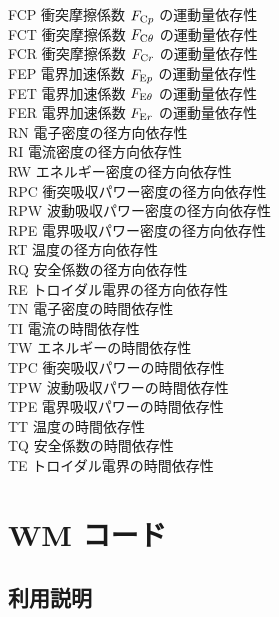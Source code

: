 \documentclass[11pt]{jarticle}
\begin{document}
\begin{tabbing}
\> FCP  \>衝突摩擦係数 $F_{\mathrm{C}p}$ の運動量依存性\\
\> FCT  \>衝突摩擦係数 $F_{\mathrm{C}\theta}$ の運動量依存性\\
\> FCR  \>衝突摩擦係数 $F_{\mathrm{C}r}$ の運動量依存性\\
\> FEP  \>電界加速係数 $F_{\mathrm{E}p}$ の運動量依存性\\
\> FET  \>電界加速係数 $F_{\mathrm{E}\theta}$ の運動量依存性\\
\> FER  \>電界加速係数 $F_{\mathrm{E}r}$ の運動量依存性\\
\> RN   \>電子密度の径方向依存性\\
\> RI   \>電流密度の径方向依存性\\
\> RW   \>エネルギー密度の径方向依存性\\
\> RPC  \>衝突吸収パワー密度の径方向依存性\\
\> RPW  \>波動吸収パワー密度の径方向依存性\\
\> RPE  \>電界吸収パワー密度の径方向依存性\\
\> RT   \>温度の径方向依存性\\
\> RQ   \>安全係数の径方向依存性\\
\> RE   \>トロイダル電界の径方向依存性\\
\> TN   \>電子密度の時間依存性\\
\> TI   \>電流の時間依存性\\
\> TW   \>エネルギーの時間依存性\\
\> TPC  \>衝突吸収パワーの時間依存性\\
\> TPW  \>波動吸収パワーの時間依存性\\
\> TPE  \>電界吸収パワーの時間依存性\\
\> TT   \>温度の時間依存性\\
\> TQ   \>安全係数の時間依存性\\
\> TE   \>トロイダル電界の時間依存性\\ 
\end{tabbing}   

\section{WM コード}

\subsection{利用説明}
\end{document}
